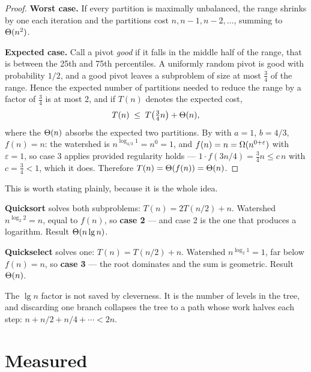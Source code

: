 \begin{proof}
\textbf{Worst case.} If every partition is maximally unbalanced, the range
shrinks by one each iteration and the partitions cost
$n, n-1, n-2, \ldots$, summing to $\Theta(n^{2})$.

\smallskip
\textbf{Expected case.} Call a pivot \emph{good} if it falls in the middle
half of the range, that is between the 25th and 75th percentiles. A uniformly
random pivot is good with probability $1/2$, and a good pivot leaves a
subproblem of size at most $\tfrac34$ of the range. Hence the expected number
of partitions needed to reduce the range by a factor of $\tfrac34$ is at most
2, and if $T(n)$ denotes the expected cost,
\[ T(n) \;\le\; T\bigl(\tfrac34 n\bigr) + \Theta(n), \]
where the $\Theta(n)$ absorbs the expected two partitions. By
 with $a = 1$, $b = 4/3$, $f(n) = n$: the watershed is
$n^{\log_{4/3} 1} = n^{0} = 1$, and $f(n) = n = \Omega(n^{0+\varepsilon})$ with
$\varepsilon = 1$, so case 3 applies provided regularity holds ---
$1 \cdot f(3n/4) = \tfrac34 n \le c\,n$ with $c = \tfrac34 < 1$, which it does.
Therefore $T(n) = \Theta(f(n)) = \Theta(n)$.
\end{proof}

\begin{conceptbox}
This is worth stating plainly, because it is the whole idea.

\smallskip
\textbf{Quicksort} solves both subproblems: $T(n) = 2T(n/2) + n$. Watershed
$n^{\log_{2}2} = n$, equal to $f(n)$, so \textbf{case 2} --- and case 2 is the
one that produces a logarithm. Result $\Theta(n\operatorname{lg} n)$.

\smallskip
\textbf{Quickselect} solves one: $T(n) = T(n/2) + n$. Watershed
$n^{\log_{2}1} = 1$, far below $f(n) = n$, so \textbf{case 3} --- the root
dominates and the sum is geometric. Result $\Theta(n)$.

\smallskip
The $\lg n$ factor is not saved by cleverness. It is the number of levels in
the tree, and discarding one branch collapses the tree to a path whose work
halves each step: $n + n/2 + n/4 + \cdots < 2n$.
\end{conceptbox}

\section{Measured}

